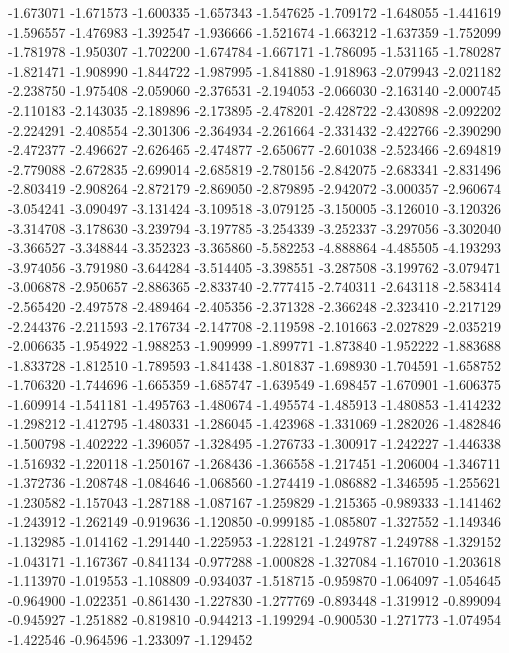 -1.673071
-1.671573
-1.600335
-1.657343
-1.547625
-1.709172
-1.648055
-1.441619
-1.596557
-1.476983
-1.392547
-1.936666
-1.521674
-1.663212
-1.637359
-1.752099
-1.781978
-1.950307
-1.702200
-1.674784
-1.667171
-1.786095
-1.531165
-1.780287
-1.821471
-1.908990
-1.844722
-1.987995
-1.841880
-1.918963
-2.079943
-2.021182
-2.238750
-1.975408
-2.059060
-2.376531
-2.194053
-2.066030
-2.163140
-2.000745
-2.110183
-2.143035
-2.189896
-2.173895
-2.478201
-2.428722
-2.430898
-2.092202
-2.224291
-2.408554
-2.301306
-2.364934
-2.261664
-2.331432
-2.422766
-2.390290
-2.472377
-2.496627
-2.626465
-2.474877
-2.650677
-2.601038
-2.523466
-2.694819
-2.779088
-2.672835
-2.699014
-2.685819
-2.780156
-2.842075
-2.683341
-2.831496
-2.803419
-2.908264
-2.872179
-2.869050
-2.879895
-2.942072
-3.000357
-2.960674
-3.054241
-3.090497
-3.131424
-3.109518
-3.079125
-3.150005
-3.126010
-3.120326
-3.314708
-3.178630
-3.239794
-3.197785
-3.254339
-3.252337
-3.297056
-3.302040
-3.366527
-3.348844
-3.352323
-3.365860
-5.582253
-4.888864
-4.485505
-4.193293
-3.974056
-3.791980
-3.644284
-3.514405
-3.398551
-3.287508
-3.199762
-3.079471
-3.006878
-2.950657
-2.886365
-2.833740
-2.777415
-2.740311
-2.643118
-2.583414
-2.565420
-2.497578
-2.489464
-2.405356
-2.371328
-2.366248
-2.323410
-2.217129
-2.244376
-2.211593
-2.176734
-2.147708
-2.119598
-2.101663
-2.027829
-2.035219
-2.006635
-1.954922
-1.988253
-1.909999
-1.899771
-1.873840
-1.952222
-1.883688
-1.833728
-1.812510
-1.789593
-1.841438
-1.801837
-1.698930
-1.704591
-1.658752
-1.706320
-1.744696
-1.665359
-1.685747
-1.639549
-1.698457
-1.670901
-1.606375
-1.609914
-1.541181
-1.495763
-1.480674
-1.495574
-1.485913
-1.480853
-1.414232
-1.298212
-1.412795
-1.480331
-1.286045
-1.423968
-1.331069
-1.282026
-1.482846
-1.500798
-1.402222
-1.396057
-1.328495
-1.276733
-1.300917
-1.242227
-1.446338
-1.516932
-1.220118
-1.250167
-1.268436
-1.366558
-1.217451
-1.206004
-1.346711
-1.372736
-1.208748
-1.084646
-1.068560
-1.274419
-1.086882
-1.346595
-1.255621
-1.230582
-1.157043
-1.287188
-1.087167
-1.259829
-1.215365
-0.989333
-1.141462
-1.243912
-1.262149
-0.919636
-1.120850
-0.999185
-1.085807
-1.327552
-1.149346
-1.132985
-1.014162
-1.291440
-1.225953
-1.228121
-1.249787
-1.249788
-1.329152
-1.043171
-1.167367
-0.841134
-0.977288
-1.000828
-1.327084
-1.167010
-1.203618
-1.113970
-1.019553
-1.108809
-0.934037
-1.518715
-0.959870
-1.064097
-1.054645
-0.964900
-1.022351
-0.861430
-1.227830
-1.277769
-0.893448
-1.319912
-0.899094
-0.945927
-1.251882
-0.819810
-0.944213
-1.199294
-0.900530
-1.271773
-1.074954
-1.422546
-0.964596
-1.233097
-1.129452

